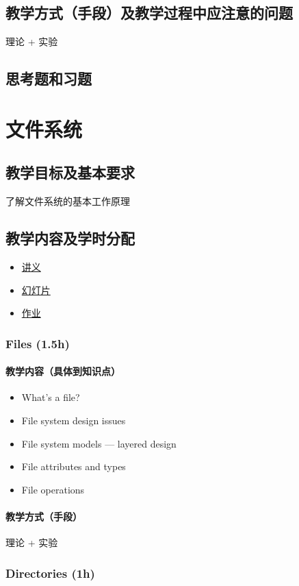 \documentclass[11pt]{article}
\begin{document}
\subsection{教学方式（手段）及教学过程中应注意的问题}
\label{sec-6-5}
理论 + 实验
\subsection{思考题和习题}
\label{sec-6-6}
\section{文件系统}
\label{sec-7}
\subsection{教学目标及基本要求}
\label{sec-7-1}
了解文件系统的基本工作原理
\subsection{教学内容及学时分配}
\label{sec-7-2}
\begin{itemize}
\item \href{./slides/fs-a.pdf}{讲义}
\item \href{./slides/fs-b.pdf}{幻灯片}
\item \href{./lab.html#sec-6}{作业}
\end{itemize}
\subsubsection{Files (1.5h)}
\label{sec-7-2-1}
\paragraph{教学内容（具体到知识点）}
\label{sec-7-2-1-1}
\begin{itemize}
\item What's a file?
\item File system design issues
\item File system models --- layered design
\item File attributes and types
\item File operations
\end{itemize}
\paragraph{教学方式（手段）}
\label{sec-7-2-1-2}
理论 + 实验
\subsubsection{Directories (1h)}
\label{sec-7-2-2}
\end{document}
